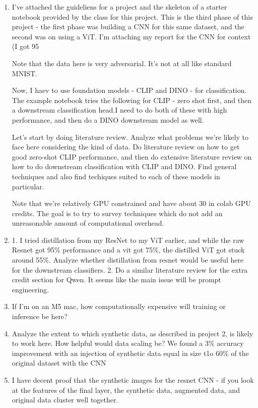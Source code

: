 \documentclass[11pt]{article}
\begin{document}
\begin{enumerate}
    \item I've attached the guideliens for a project and the skeleton of a starter notebook provided by the class for this project. This is the third phase of this project - the first phase was building a CNN for this same dataset, and the second was on using a ViT.  I'm attaching my report for the CNN for context (I got 95%

Note that the data here is very adversarial. It's not at all like standard MNIST. 

Now, I haev to use foundation models - CLIP and DINO - for classification. The example notebook tries the following for CLIP - zero shot first, and then a downstream classification head.I need to do both of these with high performance, and then do a DINO downstream model as well.


Let's start by doing literature review. Analyze what problems we're likely to face here considering the kind of data. Do literature review on how to get good zero-shot CLIP performance, and then do extensive literature review on how to do downstream classification with CLIP and DINO. Find general techniques and also find techiques suited to each of these models in particular.

Note that we're relatively GPU constrained and have about $30$ in colab GPU credits. The goal is to try to survey techniques which do not add an unreasonable amount of  computational overhead.

\item 1. I tried distillation from my ResNet to my ViT earlier, and while the raw Resnet got 95\% performance and a vit got 75\%, the distilled ViT got stuck around 55\%. Analyze whether distillation from resnet would be useful here for the downstream classifiers.
2. Do a similar literature review for the extra credit section for Qwen. It seems like the main issue will be prompt engineering.

\item If I'm on an M5 mac, how computationally expensive will training or inference be here?


\item Analyze the extent to which synthetic data, as described in project 2, is likely to work here. How helpful would data scaling be? We found a 3\% accuracy improvement with an injection of synthetic data equal in size t1o 60\% of the original dataset with the CNN

\item I have decent proof that the synthetic images for the resnet CNN - if you look at the features of the final layer, the synthetic data, augmented data, and original data cluster well together.


\end{enumerate}
\end{document}
